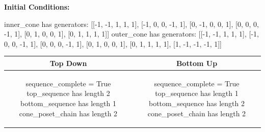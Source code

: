 \documentclass[10pt]{article}
\begin{document}
\textbf{Initial Conditions:}
\begin{SAGE}
inner_cone has generators: 
[[-1, -1, 1, 1, 1], [-1, 0, 0, -1, 1], [0, -1, 0, 0, 1], [0, 0, 0, -1, 1], [0, 1, 0, 0, 1], [0, 1, 1, 1, 1]]
outer_cone has generators: 
[[-1, -1, 1, 1, 1], [-1, 0, 0, -1, 1], [0, 0, 0, -1, 1], [0, 1, 0, 0, 1], [0, 1, 1, 1, 1], [1, -1, -1, -1, 1]]

\end{SAGE}
\begin{tabular}{c|c}
\textbf{Top Down} & \textbf{Bottom Up} \\ \hline  
\begin{SAGE}
sequence_complete = True
top_sequence has length 2
bottom_sequence has length 1
cone_poset_chain has length 2
\end{SAGE} 
&
\begin{SAGE}
sequence_complete = True
top_sequence has length 1
bottom_sequence has length 2
cone_poset_chain has length 2
\end{SAGE} 
\\ \hline


\end{tabular}
\end{document}
